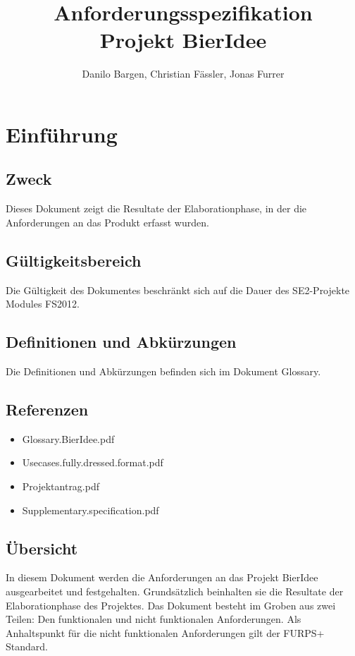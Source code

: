 \documentclass[10pt,a4paper]{scrartcl}
\author{Danilo Bargen, Christian Fässler, Jonas Furrer}
\title{Anforderungsspezifikation\\ Projekt BierIdee}
\begin{document}
\begin{titlepage}
	\maketitle
	\vspace{120mm}
	\thispagestyle{empty} %
\end{titlepage}


\section{Einführung}
\subsection{Zweck}
Dieses Dokument zeigt die Resultate der Elaborationphase, in der die Anforderungen an das Produkt erfasst wurden.
\subsection{Gültigkeitsbereich}
Die Gültigkeit des Dokumentes beschränkt sich auf die Dauer des SE2-Projekte Modules FS2012.
\subsection{Definitionen und Abkürzungen}
Die Definitionen und Abkürzungen befinden sich im Dokument Glossary.
\subsection{Referenzen}
\begin{itemize}
\item Glossary.BierIdee.pdf
\item Usecases.fully.dressed.format.pdf
\item Projektantrag.pdf
\item Supplementary.specification.pdf
\end{itemize}

\subsection{Übersicht}
In diesem Dokument werden die Anforderungen an das Projekt BierIdee ausgearbeitet und festgehalten. Grundsätzlich beinhalten sie die Resultate der Elaborationphase des Projektes. Das Dokument besteht im Groben aus zwei Teilen: Den funktionalen und nicht funktionalen Anforderungen. Als Anhaltspunkt für die nicht funktionalen Anforderungen gilt der FURPS+ Standard.
\newpage
\end{document}
